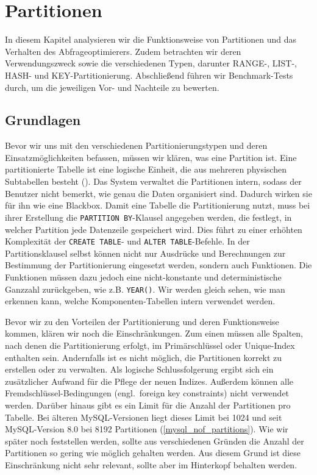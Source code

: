 
\chapter{Partitionen}\label{ch:partitions}

In diesem Kapitel analysieren wir die Funktionsweise von Partitionen und das Verhalten des Abfrageoptimierers.
Zudem betrachten wir deren Verwendungszweck sowie die verschiedenen Typen, darunter RANGE-, LIST-, HASH- und KEY-Partitionierung\@.
Abschließend führen wir Benchmark-Tests durch, um die jeweiligen Vor- und Nachteile zu bewerten.

\section{Grundlagen}\label{sec:partition-grundlagen}

Bevor wir uns mit den verschiedenen Partitionierungstypen und deren Einsatzmöglichkeiten befassen, müssen wir klären, was eine Partition ist.
Eine partitionierte Tabelle ist eine logische Einheit, die aus mehreren physischen Subtabellen besteht (\cite[pp. 265--273]{schwartz2012high}).
Das System verwaltet die Partitionen intern, sodass der Benutzer nicht bemerkt, wie genau die Daten organisiert sind.
Dadurch wirken sie für ihn wie eine Blackbox.
Damit eine Tabelle die Partitionierung nutzt, muss bei ihrer Erstellung die \texttt{PARTITION BY}-Klausel angegeben werden, die festlegt, in welcher Partition jede Datenzeile gespeichert wird.
Dies führt zu einer erhöhten Komplexität der \texttt{CREATE TABLE}- und \texttt{ALTER TABLE}-Befehle.
In der Partitionsklausel selbst können nicht nur Ausdrücke und Berechnungen zur Bestimmung der Partitionierung eingesetzt werden, sondern auch Funktionen.
Die Funktionen müssen dazu jedoch eine nicht-konstante und deterministische Ganzzahl zurückgeben, wie z.B. \texttt{YEAR()}.
Wir werden gleich sehen, wie man erkennen kann, welche Komponenten-Tabellen intern verwendet werden.

Bevor wir zu den Vorteilen der Partitionierung und deren Funktionsweise kommen, klären wir noch die Einschränkungen.
Zum einen müssen alle Spalten, nach denen die Partitionierung erfolgt, im Primärschlüssel oder Unique-Index enthalten sein.
Andernfalls ist es nicht möglich, die Partitionen korrekt zu erstellen oder zu verwalten.
Als logische Schlussfolgerung ergibt sich ein zusätzlicher Aufwand für die Pflege der neuen Indizes.
Außerdem können alle Fremdschlüssel-Bedingungen (engl.\ foreign key constraints) nicht verwendet werden.
Darüber hinaus gibt es ein Limit für die Anzahl der Partitionen pro Tabelle.
Bei älteren MySQL-Versionen liegt dieses Limit bei 1024 und seit MySQL-Version 8.0 bei 8192 Partitionen (\ref{mysql_nof_partitions}).
Wie wir später noch feststellen werden, sollte aus verschiedenen Gründen die Anzahl der Partitionen so gering wie möglich gehalten werden.
Aus diesem Grund ist diese Einschränkung nicht sehr relevant, sollte aber im Hinterkopf behalten werden.

